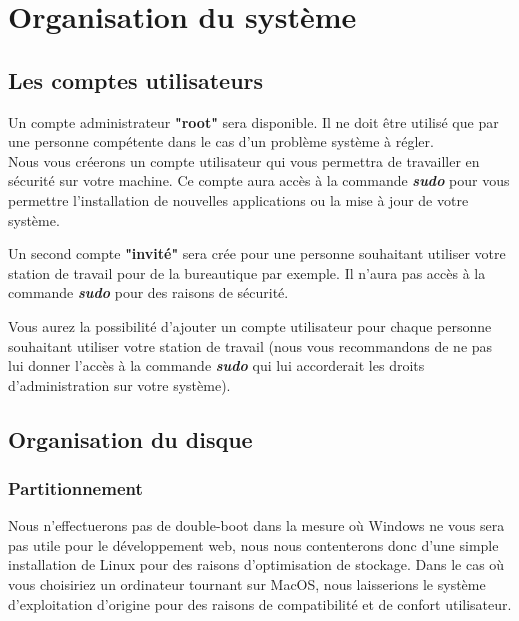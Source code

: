 \section{Organisation du système}

\subsection{Les comptes utilisateurs}

Un compte administrateur \textbf{"root"} sera disponible. Il ne doit être utilisé que par une personne compétente dans le cas d'un problème système à régler.\\

Nous vous créerons un compte utilisateur qui vous permettra de travailler en sécurité sur votre machine. Ce compte aura accès à la commande \textit{\textbf{sudo}} pour vous permettre l'installation de nouvelles applications ou la mise à jour de votre système.

Un second compte \textbf{"invité"} sera crée pour une personne souhaitant utiliser votre station de travail pour de la bureautique par exemple. Il n'aura pas accès à la commande \textit{\textbf{sudo}} pour des raisons de sécurité.

Vous aurez la possibilité d'ajouter un compte utilisateur pour chaque personne souhaitant utiliser votre station de travail (nous vous recommandons de ne pas lui donner l'accès à la commande \textit{\textbf{sudo}} qui lui accorderait les droits d'administration sur votre système).

\subsection{Organisation du disque}

\subsubsection{Partitionnement}

Nous n'effectuerons pas de double-boot dans la mesure où Windows ne vous sera pas utile pour le développement web, nous nous contenterons donc d'une simple installation de Linux pour des raisons d'optimisation de stockage. Dans le cas où vous choisiriez un ordinateur tournant sur MacOS, nous laisserions le système d'exploitation d'origine pour des raisons de compatibilité et de confort utilisateur.\\

